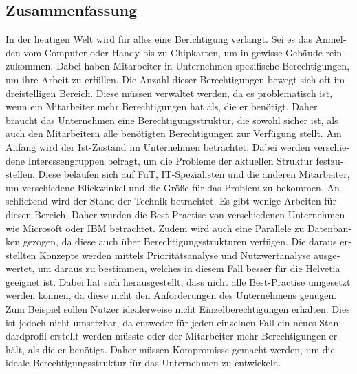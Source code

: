 \begin{otherlanguage}{ngerman}
	\chapter*{Zusammenfassung}
In der heutigen Welt wird für alles eine Berichtigung verlangt.
Sei es das Anmelden vom Computer oder Handy bis zu Chipkarten, um in gewisse Gebäude reinzukommen.
Dabei haben Mitarbeiter in Unternehmen spezifische Berechtigungen, um ihre Arbeit zu erfüllen.
Die Anzahl dieser Berechtigungen bewegt sich oft im dreistelligen Bereich.
Diese müssen verwaltet werden, da es problematisch ist, wenn ein Mitarbeiter mehr Berechtigungen hat als, die er benötigt.
Daher braucht das Unternehmen eine Berechtigungsstruktur, die sowohl sicher ist, als auch den Mitarbeitern alle benötigten Berechtigungen zur Verfügung stellt.
\newline
Am Anfang wird der Ist-Zustand im Unternehmen betrachtet.
Dabei werden verschiedene Interessengruppen befragt, um die Probleme der aktuellen Struktur festzustellen.
Diese belaufen sich auf \ac{FuT}, IT-Spezialisten und die anderen Mitarbeiter, um verschiedene Blickwinkel und die Größe für das Problem zu bekommen.
Anschließend wird der Stand der Technik betrachtet.
Es gibt wenige Arbeiten für diesen Bereich.
Daher wurden die Best-Practise von verschiedenen Unternehmen wie Microsoft oder IBM betrachtet.
Zudem wird auch eine Parallele zu Datenbanken gezogen, da diese auch über Berechtigungsstrukturen verfügen.
Die daraus erstellten Konzepte werden mittels Prioritätsanalyse und Nutzwertanalyse ausgewertet, um daraus zu bestimmen, welches in diesem Fall besser für die Helvetia geeignet ist.
\newline
Dabei hat sich herausgestellt, dass nicht alle Best-Practise umgesetzt werden können, da diese nicht den Anforderungen des Unternehmens genügen.
Zum Beispiel sollen Nutzer idealerweise nicht Einzelberechtigungen erhalten.
Dies ist jedoch nicht umsetzbar, da entweder für jeden einzelnen Fall ein neues Standardprofil erstellt werden müsste oder der Mitarbeiter mehr Berechtigungen erhält, als die er benötigt.
Daher müssen Kompromisse gemacht werden, um die ideale Berechtigungsstruktur für das Unternehmen zu entwickeln.
\end{otherlanguage}
